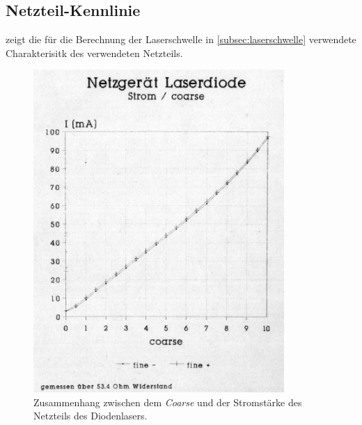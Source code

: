 \documentclass[../bericht.tex]{subfiles}
\begin{document}
  \begin{appendices}

    \section{Netzteil-Kennlinie}
    \label{sec:netzteil-kennlinie}
       zeigt die für die Berechnung der Laserschwelle in \cref{subsec:laserschwelle} verwendete Charakterisitk des verwendeten Netzteils.

      \begin{figure}[H]
        \centering
        \includegraphics[width=0.85\textwidth]{figures/Stromkennlinie_Laserdiode.pdf}
        \caption{Zusammenhang zwischen dem \textit{Coarse} und der Stromstärke des Netzteils des Diodenlasers.}
        \label{fig:netzteil-kennlinie}
      \end{figure}
  \end{appendices}
\end{document}
